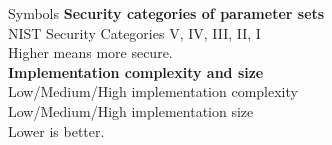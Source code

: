 \begin{minipage}[t]{0.4\textwidth}
\begin{algorithmbox}{Symbols}
        {\bfseries Security categories of parameter sets}\\[0.5\baselineskip]
         NIST Security Categories V, IV, III, II, I\\[\baselineskip]

        Higher means more secure.\\[\baselineskip]

        {\bfseries Implementation complexity and size}\\[0.5\baselineskip]
         Low/Medium/High implementation complexity\\
         Low/Medium/High implementation size\\[\baselineskip]
        Lower is better.\\[\baselineskip]


\end{algorithmbox}
\end{minipage}
